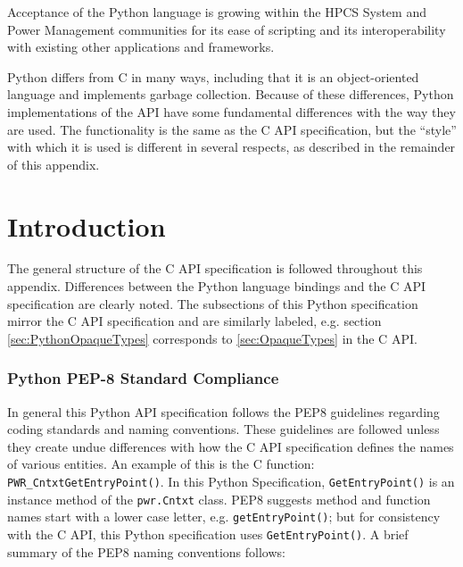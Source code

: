 \lstset{language=Python,keepspaces=true}
Acceptance of the Python language is growing within the HPCS System and Power
Management communities for its ease of scripting and its interoperability with
existing other applications and frameworks.

Python differs from C in many ways, including that it is an
object-oriented language and implements garbage collection.  Because of these differences, Python
implementations of the API have some fundamental differences with the way they
are used. The functionality is the same as the C API specification, but the
``style'' with which it is used is different in several respects, as described
in the remainder of this appendix.

\section{Introduction}\label{sec:PythonIntroduction}
The general structure of the C API specification is followed throughout this
appendix. Differences between the Python language bindings and the C API specification
are clearly noted. The subsections of this Python specification mirror the C
API specification and are similarly labeled, e.g. section
\ref{sec:PythonOpaqueTypes} corresponds to \ref{sec:OpaqueTypes} in the C API.

\subsubsection{Python PEP-8 Standard Compliance}
\label{sec:PythonPEP8StandardCompliance:GrpCreate}

In general this Python API specification follows the PEP8 guidelines
regarding coding standards and naming conventions. These guidelines are
followed unless they create undue differences with how the C API specification
defines the names of various entities. An example of this is the C function:
\texttt{PWR_CntxtGetEntryPoint()}. In this Python Specification,
\texttt{GetEntryPoint()} is an instance method of the \texttt{pwr.Cntxt} class.
PEP8 suggests method and function names start with a lower case letter, e.g.
\texttt{getEntryPoint()}; but for consistency with the C API, this Python
specification uses \texttt{GetEntryPoint()}. A brief summary of the
PEP8 naming conventions follows:

